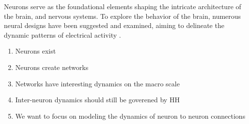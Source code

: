 \documentclass[class={myRUCProject}, crop=false]{standalone}
\begin{document}


Neurons serve as the foundational elements shaping the intricate architecture of the brain, and nervous systems. To explore the behavior of the brain, numerous neural designs have been suggested and examined, aiming to delineate the dynamic patterns of electrical activity \cite{njitacke2020hidden}.




\begin{enumerate}
    \item Neurons exist
    \item Neurons  create networks
    \item Networks have interesting dynamics on the macro scale
    \item Inter-neuron dynamics should still be goverened by HH
    \item We want to focus on modeling the dynamics of neuron to neuron connections
\end{enumerate}
\end{document}
